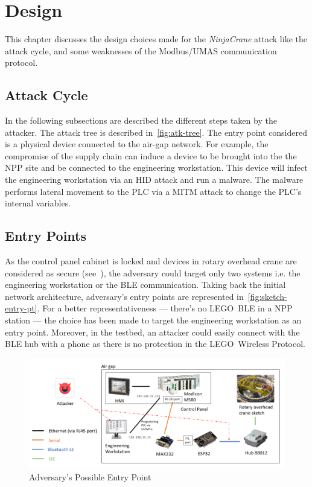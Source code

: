 \chapter{Design}

This chapter discusses the design choices made for the \emph{NinjaCrane} attack like the attack cycle, and some weaknesses of the Modbus/UMAS communication protocol.

\section{Attack Cycle}

In the following subsections are described the different steps taken by the attacker. The attack tree is described in~\autoref{fig:atk-tree}. The entry point considered is a physical device connected to the air-gap network. For example, the compromise of the supply chain can induce a device to be brought into the the NPP site and be connected to the engineering workstation. This device will infect the engineering workstation via an HID attack and run a malware. The malware performs lateral movement to the PLC via a MITM attack to change the PLC's internal variables. 

\section{Entry Points}

As the control panel cabinet is locked and devices in rotary overhead crane are considered as secure (see~), the adversary could target only two systems i.e. the engineering workstation or the BLE communication. Taking back the initial network architecture, adversary's entry points are represented in~\autoref{fig:sketch-entry-pt}. For a better representativeness — there's no LEGO\texttrademark\ BLE in a NPP station — the choice has been made to target the engineering workstation as an entry point. Moreover, in the testbed, an attacker could easily connect with the BLE hub with a phone as there is no protection in the LEGO\texttrademark\ Wireless Protocol.

\begin{figure}[H]
    \centering
    \includegraphics[width=\linewidth]{figures/Sketch.PNG}
    \caption{Adversary's Possible Entry Point}
    \label{fig:sketch-entry-pt}
\end{figure}

